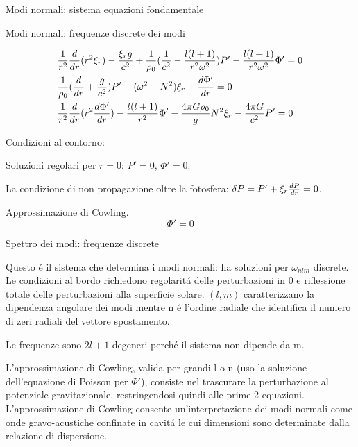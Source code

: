 \documentclass[10pt,xcolor={usenames},fleqn,mathserif,serif]{beamer}
\begin{document}
\begin{frame}{Modi normali: sistema equazioni fondamentale}

\begin{block}{Modi normali: frequenze discrete dei modi}

\begin{subequations}%
\begin{align*}
&\frac{1}{r^2}\TDof{r}(r^2\xi_r)-\frac{\xi_rg}{c^2}+\frac{1}{\rho_0}(\frac{1}{c^2}-\frac{l(l+1)}{r^2\omega^2})P'-\frac{l(l+1)}{r^2\omega^2}\Phi'=0\\
&\frac{1}{\rho_0}(\TDof{r}+\frac{g}{c^2})P'-(\omega^2-N^2)\xi_r+\TDy{r}{\Phi'}=0\\
&\frac{1}{r^2}\TDof{r}(r^2\TDy{r}{\Phi'})-\frac{l(l+1)}{r^2}\Phi'-\frac{4\pi G\rho_0}{g}N^2\xi_r-\frac{4\pi G}{c^2}P'=0
\end{align*}
\end{subequations}

Condizioni al contorno:

Soluzioni regolari per $r=0$: $P'=0$, $\Phi'=0$.

La condizione di non propagazione oltre la fotosfera: $\Lvar{P}=P'+\xi_r\TDy{r}{P}=0$.

\end{block}

\begin{block}{Approssimazione di Cowling.}
\[\Phi'=0\]
\end{block}

\end{frame}

\begin{wordonframe}{Spettro dei modi: frequenze discrete}

Questo \'e il sistema che determina i modi normali: ha soluzioni per $\omega_{nlm}$ discrete. Le condizioni al bordo richiedono regolarit\'a delle perturbazioni in 0 e riflessione totale delle perturbazioni alla superficie solare. $(l,m)$ caratterizzano la dipendenza angolare dei modi mentre n \'e l'ordine radiale che identifica il numero di zeri radiali del vettore spostamento.

Le frequenze sono $2l+1$ degeneri perch\'e il sistema non dipende da m.

L'approssimazione di Cowling, valida per grandi l o n (uso la soluzione dell'equazione di Poisson per $\Phi'$), consiste nel trascurare la perturbazione al potenziale gravitazionale, restringendosi quindi alle prime 2 equazioni. L'approssimazione di Cowling consente un'interpretazione dei modi normali come onde gravo-acustiche confinate in cavit\'a le cui dimensioni sono determinate dalla relazione di dispersione.

\end{wordonframe}
\end{document}
